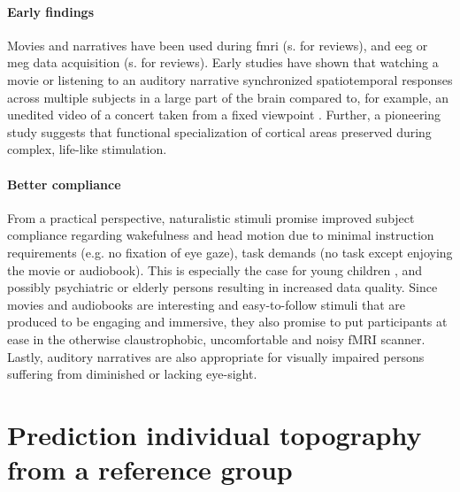 \paragraph{Early findings}
Movies and narratives have been used during \ac{fmri}
(s.\citet{hamilton2018revolution, hasson2008neurocinematics,
jaaskelainen2021movies, sonkusare2019naturalistic, saarimaki2021naturalistic}
for reviews), and \ac{eeg} or \ac{meg} data acquisition (s. \citet{alday2019meg,
kandylaki2019story} for reviews).
%
Early studies have shown that watching a movie or listening to an auditory
narrative synchronized spatiotemporal responses across multiple subjects in a
large part of the brain compared to, for example, an unedited video of a concert
taken from a fixed viewpoint \citep{hasson2004intersubject,
hasson2008neurocinematics, lerner2011topographic, wilson2008beyond}.
%
Further, a pioneering study \citep{bartels2004mapping} suggests that functional
specialization of cortical areas preserved during complex, life-like stimulation.


\paragraph{Better compliance}

%
From a practical perspective, naturalistic stimuli promise improved subject
compliance regarding wakefulness and head motion due to minimal instruction
requirements (e.g. no fixation of eye gaze), task demands (no task except
enjoying the movie or audiobook).
%
This is especially the case for young children \citep{vanderwal2015inscapes},
and possibly psychiatric \citep{eickhoff2020towards} or elderly persons
resulting in increased data quality.
%
Since movies and audiobooks are interesting and easy-to-follow stimuli that are
produced to be engaging and immersive, they also promise to put participants at
ease in the otherwise claustrophobic, uncomfortable and noisy fMRI scanner.
%
Lastly, auditory narratives are also appropriate for visually impaired persons
suffering from diminished or lacking eye-sight.


\section{Prediction individual topography from a reference group}

